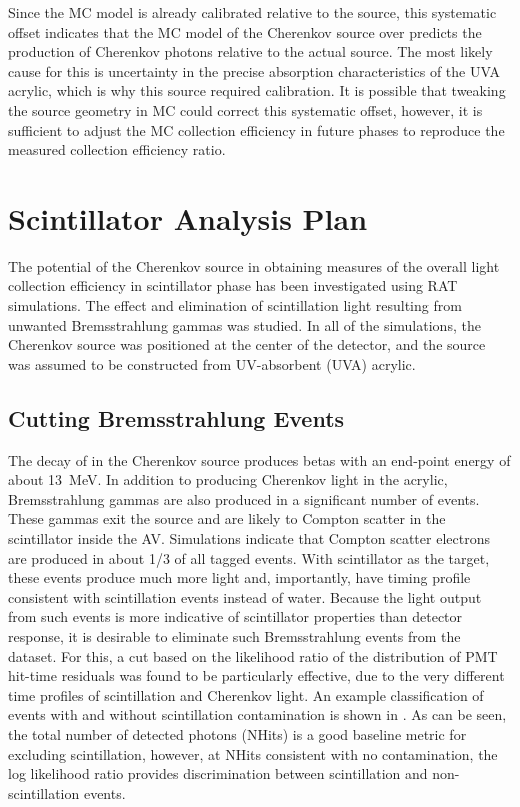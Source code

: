 Since the MC model is already calibrated relative to the \N source, this systematic offset indicates that the MC model of the Cherenkov source over predicts the production of Cherenkov photons relative to the actual source.
The most likely cause for this is uncertainty in the precise absorption characteristics of the UVA acrylic, which is why this source required calibration.
It is possible that tweaking the source geometry in MC could correct this systematic offset, however, it is sufficient to adjust the MC collection efficiency in future phases to reproduce the measured collection efficiency ratio.


\section{Scintillator Analysis Plan}
The potential of the Cherenkov source in obtaining measures of the overall light collection efficiency in scintillator phase has been investigated using RAT simulations. 
The effect and elimination of scintillation light resulting from unwanted Bremsstrahlung gammas was studied.  
In all of the simulations, the Cherenkov source was positioned at the center of the detector, and the source was assumed to be constructed from UV-absorbent (UVA) acrylic.

\subsection{Cutting Bremsstrahlung Events}

The decay of \Li in the Cherenkov source produces betas with an end-point energy of about 13~MeV. 
In addition to producing Cherenkov light in the acrylic, Bremsstrahlung gammas are also produced in a significant number of events.  
These gammas exit the source and are likely to Compton scatter in the scintillator inside the AV.  
Simulations indicate that Compton scatter electrons are produced in about 1/3 of all tagged events.  
With scintillator as the target, these events produce much more light and, importantly, have timing profile consistent with scintillation events instead of water.  
Because the light output from such events is more indicative of scintillator properties than detector response, it is desirable to eliminate such Bremsstrahlung events from the dataset.
For this, a cut based on the likelihood ratio of the distribution of PMT hit-time residuals was found to be particularly effective, due to the very different time profiles of scintillation and Cherenkov light.
An example classification of events with and without scintillation contamination is shown in .
As can be seen, the total number of detected photons (NHits) is a good baseline metric for excluding scintillation, however, at NHits consistent with no contamination, the log likelihood ratio provides discrimination between scintillation and non-scintillation events. 

